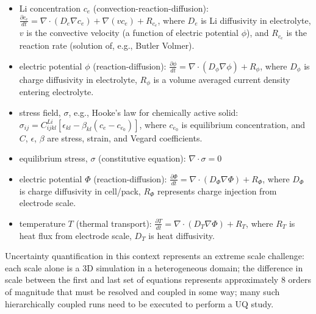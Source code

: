 \documentclass[11pt]{article}
\newcommand{\MarginPar}[1]{\marginpar{%
\vskip-\baselineskip %
\raggedright\tiny\sffamily
\hrule\smallskip{\color{red}#1}\par\smallskip\hrule}}
\begin{document}
\begin{itemize}\itemsep -0.0em
\item
Li concentration $c_e$ (convection-reaction-diffusion): $\frac{\partial c_e}{dt} = \nabla \cdot (D_e \nabla c_e) + \nabla (v c_e) + R_{c_e}$, where $D_e$ is Li diffusivity in electrolyte, $v$ is the 
convective velocity (a function of electric potential $\phi$), and $R_{c_e}$ is the reaction rate (solution of, e.g., Butler
Volmer). 
\item
electric potential $\phi$ (reaction-diffusion): $\frac{\partial \phi}{dt} = \nabla \cdot (D_{\phi} \nabla \phi)  + R_{\phi}$, where $D_{\phi}$ is charge diffusivity in electrolyte, $R_{\phi}$ is a volume averaged current density entering electrolyte.
\item
stress field, $\sigma$, e.g., Hooke's law for chemically active solid: $\sigma_{ij} = C_{ijkl}^{Li} [\epsilon_{kl} - \beta_{kl}(c_e - c_{e_0})] $, where $c_{e_0}$ is equilibrium concentration, and $C$, $\epsilon$, $\beta$ are stress, strain, and Vegard coefficients.
\item
equilibrium stress, $\sigma$ (constitutive equation): $\nabla \cdot \sigma = 0$ 
\end{itemize}

\begin{itemize}\itemsep -0.0em
\item
electric potential $\Phi$ (reaction-diffusion): $\frac{\partial \Phi}{dt} = \nabla \cdot (D_{\Phi} \nabla \Phi) + R_{\Phi}$,
where $D_{\Phi}$ is charge diffusivity in cell/pack, $R_{\Phi}$ represents charge injection from electrode scale. 
\item
temperature $T$ (thermal transport): $\frac{\partial T}{dt} = \nabla \cdot (D_T \nabla \Phi) + R_T$, where $R_T$ is heat flux from electrode scale, $D_T$ is heat diffusivity.
\end{itemize}

Uncertainty quantification in this context represents an
extreme scale challenge:
each scale alone is a 3D simulation in a heterogeneous domain;
the difference in scale between the first and last set of equations represents approximately 8 orders of magnitude that must be resolved and coupled in some way;
many such hierarchically coupled runs need to be executed to perform a UQ study.
  
\end{document}

